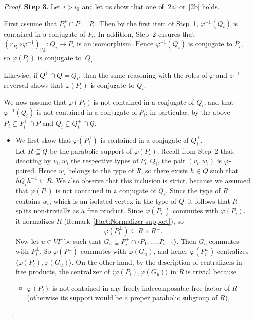 \documentclass[a4paper,english,11pt]{article}
\theoremstyle{definition}
\theoremstyle{remark}
\begin{document}
\begin{proof}
\underline{\textbf{Step 3.}} Let $i>i_0$ and let us show that one of \ref{2a} or~\ref{2b} holds.
\smallskip

First assume that $P_i^+\cap P=P_i$. Then by the first item of Step~1, $\varphi^{-1}(Q_i)$ is contained in a conjugate of $P_i$. In addition, Step~2 ensures that $(r_{P_i}\circ\varphi^{-1})_{|Q_i}:Q_i\to P_i$ is an isomorphism.
Hence $\varphi^{-1}(Q_i)$ is conjugate to $P_i$, so $\varphi(P_i)$ is conjugate to~$Q_i$. 

Likewise, if $Q_i^+\cap Q=Q_i$, then the same reasoning with the roles of $\varphi$ and $\varphi^{-1}$ reversed shows that $\varphi(P_i)$ is conjugate to $Q_i$.

We now assume that $\varphi(P_i)$ is not contained in a conjugate of $Q_i$, and that $\varphi^{-1}(Q_i)$ is not contained in a conjugate of $P_i$; in particular, by the above, $P_i\subsetneq P_i^+\cap P$ and $Q_i\subsetneq Q_i^+\cap Q$. 
\begin{itemize}
\item We first show that $\varphi(P_i^\perp)$ is contained in a conjugate of $Q_i^\perp$.\\
Let $R\subseteq Q$ be the parabolic support of $\varphi(P_i)$. Recall from Step~2 that, denoting by $v_i,w_i$ the respective types of $P_i,Q_i$, the pair $(v_i,w_i)$ is $\varphi$-paired. Hence $w_i$ belongs to the type of $R$, so there exists $h\in Q$ such that $hQ_ih^{-1}\subseteq R$. We also observe that this inclusion is strict, because we assumed that $\varphi(P_i)$ is not contained in a conjugate of $Q_i$. Since the type of $R$ contains $w_i$, which is an isolated vertex in the type of $Q$, it follows that $R$ splits non-trivially as a free product. Since $\varphi(P_i^\perp)$ commutes with $\varphi(P_i)$, it normalizes $R$ (Remark~\ref{Fact:Normalizer-support}), so 
\begin{equation*}
    \varphi\left(P_i^\perp\right)\subseteq R\times R^{\perp}.
\end{equation*} 
Now let $u\in V\Gamma$ be such that $G_{u}\subseteq P_i^+\cap \langle P_1,\dots,P_{i-1}\rangle$. Then $G_u$ commutes with $P_i^\perp$. So 
$\varphi(P_i^\perp)$ commutes with $\varphi(G_{u})$, 
and hence $\varphi(P_i^{\perp})$ centralizes $\langle \varphi(P_i),\varphi(G_u)\rangle$. On the other hand, by the description of centralizers in free products, the centralizer of $\langle \varphi(P_i),\varphi(G_u)\rangle$ in $R$ is trivial because
\begin{itemize}
    \item $\varphi(P_i)$ is not contained in any freely indecomposable free factor of $R$ (otherwise its support would be a proper parabolic subgroup of $R$),

\end{itemize}
\end{itemize}
\end{proof}
\end{document}

